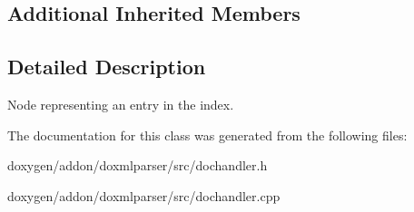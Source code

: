 \subsection*{Additional Inherited Members}


\subsection{Detailed Description}
Node representing an entry in the index. 



The documentation for this class was generated from the following files\+:\begin{DoxyCompactItemize}
\item 
doxygen/addon/doxmlparser/src/dochandler.\+h\item 
doxygen/addon/doxmlparser/src/dochandler.\+cpp\end{DoxyCompactItemize}
